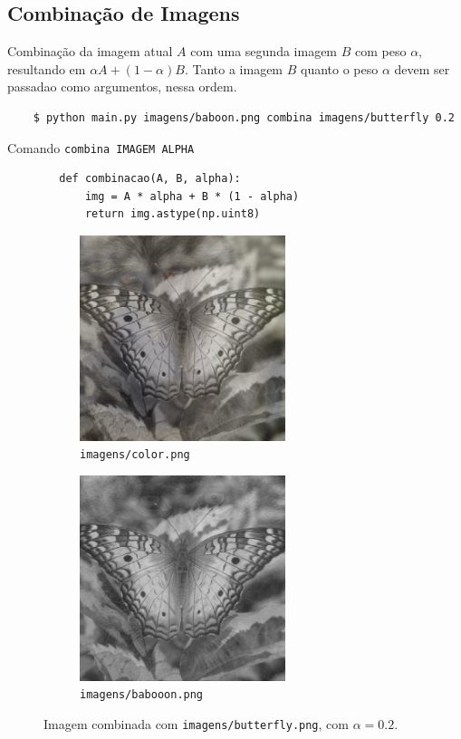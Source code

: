 \subsection{Combinação de Imagens}

Combinação da imagem atual $A$ com uma segunda imagem $B$ com peso $\alpha$, resultando em $\alpha A + (1 - \alpha) B$. Tanto a imagem $B$ quanto o peso $\alpha$ devem ser passadao como argumentos, nessa ordem.

\begin{verbatim}
    $ python main.py imagens/baboon.png combina imagens/butterfly 0.2
\end{verbatim}

\begin{listing}[H]
    \caption{Comando \texttt{combina IMAGEM ALPHA}}

    \begin{verbatim}
        def combinacao(A, B, alpha):
            img = A * alpha + B * (1 - alpha)
            return img.astype(np.uint8)
    \end{verbatim}
\end{listing}

\begin{figure}[H]
    \centering
    \begin{subfigure}{0.45\textwidth}
        \centering
        \includegraphics[width=6cm]{resultados/colormerg.png}
        \caption{\texttt{imagens/color.png}}
    \end{subfigure}%
    \begin{subfigure}{0.45\textwidth}
        \centering
        \includegraphics[width=6cm]{resultados/baboonmerg.png}
        \caption{\texttt{imagens/babooon.png}}
    \end{subfigure}

    \caption{Imagem combinada com \texttt{imagens/butterfly.png}, com $\alpha = 0.2$.}
\end{figure}
